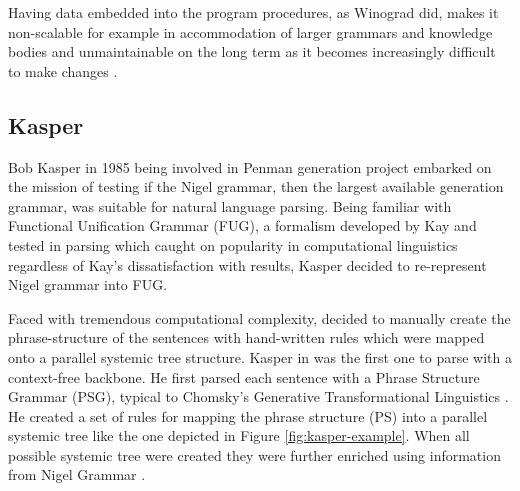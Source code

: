 Having data embedded into the program procedures, as Winograd did, makes it non-scalable for example in accommodation of larger grammars and knowledge bodies and unmaintainable on the long term as it becomes increasingly difficult to make changes \citep{Weerasinghe1994}.

\subsection{Kasper}
Bob Kasper in 1985 being involved in Penman generation project embarked on the mission of testing if the Nigel grammar, then the largest available generation grammar, was suitable for natural language parsing. Being familiar with Functional Unification Grammar (FUG), a formalism developed by Kay and tested in parsing \citep{Kay1985} which caught on popularity in computational linguistics regardless of Kay's dissatisfaction with results, Kasper decided to re-represent Nigel grammar into FUG. 

Faced with tremendous computational complexity, \citet{Kasper1988} decided to manually create the phrase-structure of the sentences with hand-written rules which were mapped onto a parallel systemic tree structure. Kasper in \citeyear{Kasper1988} was the first one to parse with a context-free backbone. He first parsed each sentence with a Phrase Structure Grammar (PSG), typical to Chomsky's Generative Transformational Linguistics \citet{Chomsky1957}. He created a set of rules for mapping the phrase structure (PS) into a parallel systemic tree like the one depicted in Figure \ref{fig:kasper-example}. When all possible systemic tree were created they were further enriched using information from Nigel Grammar \citep{Matthiessen1985}.


